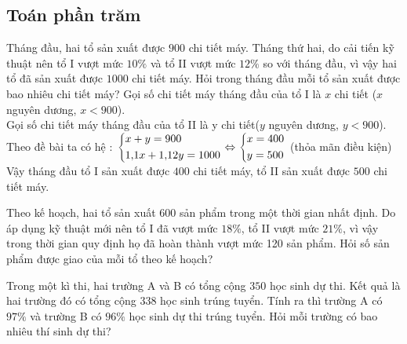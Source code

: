 \subsection*{Toán phần trăm}

\begin{bt}%
 Tháng đầu, hai tổ sản xuất được $900$ chi tiết máy. Tháng thứ hai, do cải tiến kỹ thuật nên tổ I vượt mức $10\%$ và tổ II vượt mức $12\%$ so với tháng đầu, vì vậy hai tổ đã sản xuất được $1000$ chi tiết máy. Hỏi trong tháng đầu mỗi tổ sản xuất được bao nhiêu chi tiết máy? 
  \loigiai
    {Gọi số chi tiết máy tháng đầu của tổ I là $x$ chi tiết ($x$ nguyên dương, $x<900$).\\
    		Gọi số chi tiết máy tháng đầu của tổ II là y chi tiết($y$ nguyên dương, $y<900$).\\
    		Theo đề bài ta có hệ : $\left\{\begin{aligned}&x+y=900\\&1{,}1x+1{,}12y=1000\end{aligned}\right.\Leftrightarrow \left\{\begin{aligned}&x=400\\&y=500\end{aligned}\right.$ (thỏa mãn điều kiện)\\
    		Vậy tháng đầu tổ I sản xuất được $400$ chi tiết máy, tổ II sản xuất được $500$ chi tiết máy.
    }
\end{bt}

\begin{bt}%
	Theo kế hoạch, hai tổ sản xuất 600 sản phẩm trong một thời gian nhất định. Do áp dụng kỹ thuật mới nên tổ I đã vượt mức $18 \%$, tổ II vượt mức $21\%$, vì vậy trong thời gian quy định họ đã hoàn thành vượt mức 120 sản phẩm. Hỏi số sản phẩm được giao của mỗi tổ theo kế hoạch?
\end{bt}  

\begin{bt}%
	Trong một kì thi, hai trường A và B có tổng cộng $350$ học sinh dự thi. Kết quả là hai trường đó có tổng cộng $338$ học sinh trúng tuyển. Tính ra thì trường A có $97\%$ và trường B có $96\%$ học sinh dự thi trúng tuyển. Hỏi mỗi trường có bao nhiêu thí sinh dự thi?
\end{bt}

